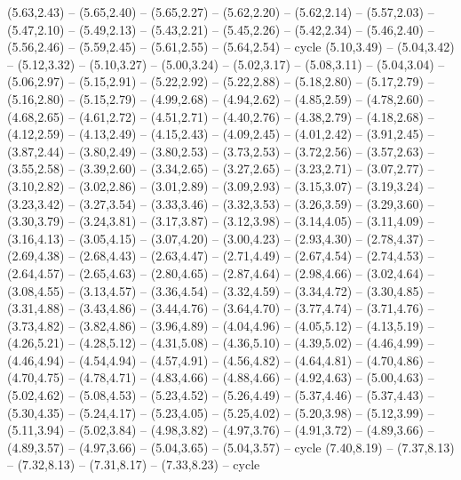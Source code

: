 \expandafter\def\csname geo:gebiet:FRA\endcsname{
  (5.63,2.43) -- (5.65,2.40) -- (5.65,2.27) -- (5.62,2.20) -- (5.62,2.14) -- (5.57,2.03) -- (5.47,2.10) -- (5.49,2.13) -- (5.43,2.21) -- (5.45,2.26) -- (5.42,2.34) -- (5.46,2.40) -- (5.56,2.46) -- (5.59,2.45) -- (5.61,2.55) -- (5.64,2.54) -- cycle
  (5.10,3.49) -- (5.04,3.42) -- (5.12,3.32) -- (5.10,3.27) -- (5.00,3.24) -- (5.02,3.17) -- (5.08,3.11) -- (5.04,3.04) -- (5.06,2.97) -- (5.15,2.91) -- (5.22,2.92) -- (5.22,2.88) -- (5.18,2.80) -- (5.17,2.79) -- (5.16,2.80) -- (5.15,2.79) -- (4.99,2.68) -- (4.94,2.62) -- (4.85,2.59) -- (4.78,2.60) -- (4.68,2.65) -- (4.61,2.72) -- (4.51,2.71) -- (4.40,2.76) -- (4.38,2.79) -- (4.18,2.68) -- (4.12,2.59) -- (4.13,2.49) -- (4.15,2.43) -- (4.09,2.45) -- (4.01,2.42) -- (3.91,2.45) -- (3.87,2.44) -- (3.80,2.49) -- (3.80,2.53) -- (3.73,2.53) -- (3.72,2.56) -- (3.57,2.63) -- (3.55,2.58) -- (3.39,2.60) -- (3.34,2.65) -- (3.27,2.65) -- (3.23,2.71) -- (3.07,2.77) -- (3.10,2.82) -- (3.02,2.86) -- (3.01,2.89) -- (3.09,2.93) -- (3.15,3.07) -- (3.19,3.24) -- (3.23,3.42) -- (3.27,3.54) -- (3.33,3.46) -- (3.32,3.53) -- (3.26,3.59) -- (3.29,3.60) -- (3.30,3.79) -- (3.24,3.81) -- (3.17,3.87) -- (3.12,3.98) -- (3.14,4.05) -- (3.11,4.09) -- (3.16,4.13) -- (3.05,4.15) -- (3.07,4.20) -- (3.00,4.23) -- (2.93,4.30) -- (2.78,4.37) -- (2.69,4.38) -- (2.68,4.43) -- (2.63,4.47) -- (2.71,4.49) -- (2.67,4.54) -- (2.74,4.53) -- (2.64,4.57) -- (2.65,4.63) -- (2.80,4.65) -- (2.87,4.64) -- (2.98,4.66) -- (3.02,4.64) -- (3.08,4.55) -- (3.13,4.57) -- (3.36,4.54) -- (3.32,4.59) -- (3.34,4.72) -- (3.30,4.85) -- (3.31,4.88) -- (3.43,4.86) -- (3.44,4.76) -- (3.64,4.70) -- (3.77,4.74) -- (3.71,4.76) -- (3.73,4.82) -- (3.82,4.86) -- (3.96,4.89) -- (4.04,4.96) -- (4.05,5.12) -- (4.13,5.19) -- (4.26,5.21) -- (4.28,5.12) -- (4.31,5.08) -- (4.36,5.10) -- (4.39,5.02) -- (4.46,4.99) -- (4.46,4.94) -- (4.54,4.94) -- (4.57,4.91) -- (4.56,4.82) -- (4.64,4.81) -- (4.70,4.86) -- (4.70,4.75) -- (4.78,4.71) -- (4.83,4.66) -- (4.88,4.66) -- (4.92,4.63) -- (5.00,4.63) -- (5.02,4.62) -- (5.08,4.53) -- (5.23,4.52) -- (5.26,4.49) -- (5.37,4.46) -- (5.37,4.43) -- (5.30,4.35) -- (5.24,4.17) -- (5.23,4.05) -- (5.25,4.02) -- (5.20,3.98) -- (5.12,3.99) -- (5.11,3.94) -- (5.02,3.84) -- (4.98,3.82) -- (4.97,3.76) -- (4.91,3.72) -- (4.89,3.66) -- (4.89,3.57) -- (4.97,3.66) -- (5.04,3.65) -- (5.04,3.57) -- cycle}
\expandafter\def\csname geo:gebiet:ALD\endcsname{
  (7.40,8.19) -- (7.37,8.13) -- (7.32,8.13) -- (7.31,8.17) -- (7.33,8.23) -- cycle}
